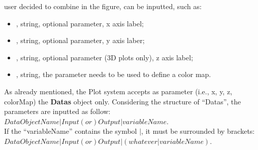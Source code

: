 user decided to combine in the figure, can be inputted, such as:
\begin{itemize}
  \item \textit{}, string, optional parameter, x axis label;
  \item \textit{}, string, optional parameter, y axis laber;
  \item \textit{}, string, optional parameter (3D plots only), z axis
  label;
  \item \textit{}, string, the parameter needs to be used to define
  a color map.
\end{itemize}
As already mentioned, the Plot system accepts as parameter (i.e., x, y, z,
colorMap) the \textbf{Datas} object only.
%
Considering the structure of ``Datas'', the parameters are inputted as follow:
\\ $DataObjectName|Input(or)Output|variableName$.
%
\\ If the ``variableName'' contains the symbol $|$, it must be surrounded by
brackets:
\\ $DataObjectName|Input(or)Output|(whatever|variableName)$.

